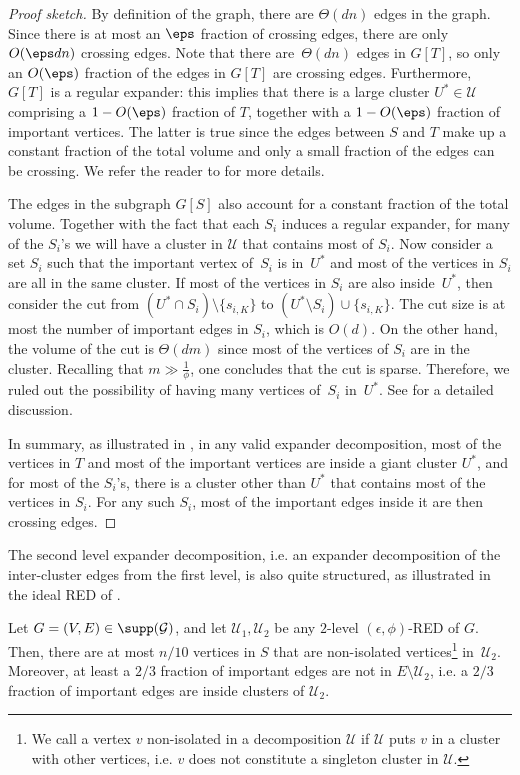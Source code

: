 \begin{proof} [Proof sketch]
    By definition of the graph, there are $\Theta(dn)$ edges in the graph. Since there is at most an $\eps$ fraction of crossing edges, there are only $O(\eps dn)$ crossing edges. Note that there are~$\Theta(dn)$ edges in $G[T]$, so only an $O(\eps)$ fraction of the edges in $G[T]$ are crossing edges. Furthermore, $G[T]$ is a regular expander: this implies that there is a large cluster $U^* \in \mathcal{U}$ comprising a $1-O(\eps)$ fraction of $T$, together with a $1-O(\eps)$ fraction of important vertices. The latter is true since the edges between $S$ and $T$ make up a constant fraction of the total volume and only a small fraction of the edges can be crossing. We refer the reader to  for more details. 
    

    The edges in the subgraph $G[S]$ also account for a constant fraction of the total volume. Together with the fact that each $S_i$ induces a regular expander, for many of the $S_i$'s we will have a cluster in $\mathcal{U}$ that contains most of $S_i$. Now consider a set $S_i$ such that the important vertex of~$S_i$ is in~$U^*$ and most of the vertices in $S_i$ are all in the same cluster. If most of the vertices in $S_i$ are also inside~$U^*$, then consider the cut from $(U^* \cap S_i )\setminus\{s_{i,K}\} $ to $(U^* \setminus S_i) \cup \{s_{i,K}\}$. The cut size is at most the number of important edges in $S_i$, which is $O(d)$. On the other hand, the volume of the cut is $\Theta(dm)$ since most of the vertices of $S_i$ are in the cluster. Recalling that $m \gg \frac{1}{\phi}$, one concludes that the cut is sparse. Therefore, we ruled out the possibility of having many vertices of~$S_i$ in~$U^*$. See  for a detailed discussion. 
    
    In summary, as illustrated in , in any valid expander decomposition, most of the vertices in $T$ and most of the important vertices are inside a giant cluster $U^*$, and for most of the $S_i$'s, there is a cluster other than $U^*$ that contains most of the vertices in $S_i$. For any such $S_i$, most of the important edges inside it are then crossing edges.
\end{proof}
\noindent
The second level expander decomposition, i.e. an expander decomposition of the inter-cluster edges from the first level, is also quite structured, as illustrated in the ideal RED of . 

\begin{lemma} \label{lem:sec-round-ov}
    Let $G=(V,E) \in \supp(\mathcal{G})$, and let $\mathcal{U}_1,\mathcal{U}_2$ be any $2$-level $(\epsilon,\phi)$-RED  of $G$. Then, there are at most $n/10$ vertices in $S$ that are non-isolated vertices\footnote{We call a vertex $v$ non-isolated in a decomposition $\mathcal{U}$ if $\mathcal{U}$ puts $v$ in a cluster with other vertices, i.e. $v$ does not constitute a singleton cluster in $\mathcal{U}$.} in~$\mathcal{U}_2$. Moreover, at least a $2/3$ fraction of important edges are not in $E\setminus \mathcal{U}_2$, i.e. a $2/3$ fraction of important edges are inside clusters of $ \mathcal{U}_2$.
\end{lemma}

